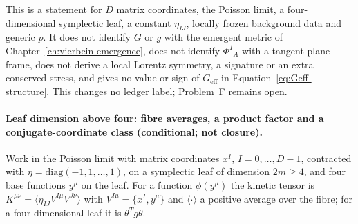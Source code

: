 This is a statement for \(D\) matrix coordinates, the Poisson limit, a four-dimensional symplectic leaf, a constant \(\eta_{IJ}\), locally frozen background data and generic \(p\). It does not identify \(G\) or \(g\) with the emergent metric of Chapter~\ref{ch:vierbein-emergence}, does not identify \(\Phi^{I}{}_{A}\) with a tangent-plane frame, does not derive a local Lorentz symmetry, a signature or an extra conserved stress, and gives no value or sign of \(G_{\mathrm{eff}}\) in Equation~\eqref{eq:Geff-structure}. This changes no ledger label; Problem~F remains open.

\paragraph{Leaf dimension above four: fibre averages, a product factor and a conjugate-coordinate class (conditional; not closure).}
Work in the Poisson limit with matrix coordinates \(x^I\), \(I=0,\dots,D-1\), contracted with \(\eta=\mathrm{diag}(-1,1,\dots,1)\), on a symplectic leaf of dimension \(2m\ge4\), and four base functions \(y^\mu\) on the leaf. For a function \(\phi(y^\mu)\) the kinetic tensor is \(K^{\mu\nu}=\langle\eta_{IJ}V^{I\mu}V^{J\nu}\rangle\) with \(V^{I\mu}=\{x^I,y^\mu\}\) and \(\langle\cdot\rangle\) a positive average over the fibre; for a four-dimensional leaf it is \(\theta^{T}g\theta\).

